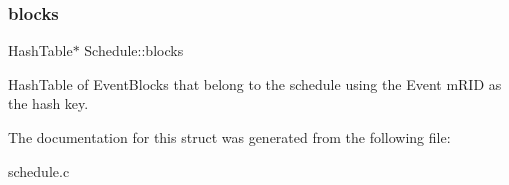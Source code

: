 \subsubsection{\texorpdfstring{blocks}{blocks}}
{\footnotesize\ttfamily Hash\+Table$\ast$ Schedule\+::blocks}

Hash\+Table of Event\+Blocks that belong to the schedule using the Event m\+R\+ID as the hash key. 

The documentation for this struct was generated from the following file\+:\begin{DoxyCompactItemize}
\item 
schedule.\+c\end{DoxyCompactItemize}
